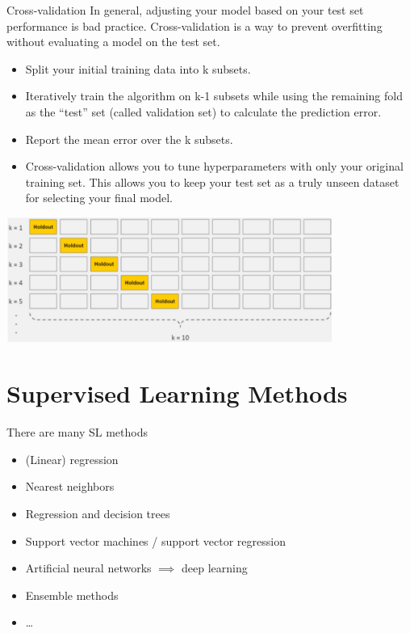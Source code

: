 \begin{frame}[allowframebreaks]{Cross-validation}
  In general, adjusting your model based on your test set performance is bad practice. Cross-validation is a way to prevent overfitting without evaluating a model on the test set. 
  \begin{itemize}
    \item Split your initial training data into k subsets. 
    \item Iteratively train the algorithm on k-1 subsets while using the remaining fold as the “test” set (called validation set) to calculate the prediction error.
    \item Report the mean error over the k subsets. 
    \item Cross-validation allows you to tune hyperparameters with only your original training set. This allows you to keep your test set as a truly unseen dataset for selecting your final model.
  \end{itemize}
  
  \begin{center}
  \includegraphics[width=0.8\textwidth]{images/CV.png}
  \end{center}
  \end{frame}

  \section{Supervised Learning Methods}

  \begin{frame}{There are many SL methods}
    \label{SL_methods}      
    \begin{itemize}
        \item (Linear) regression
        \item Nearest neighbors
        \item Regression and decision trees
        \item Support vector machines / support vector regression
        \item Artificial neural networks $\implies$ deep learning
        \item Ensemble methods
        \item …
    \end{itemize}
  \end{frame}
  
